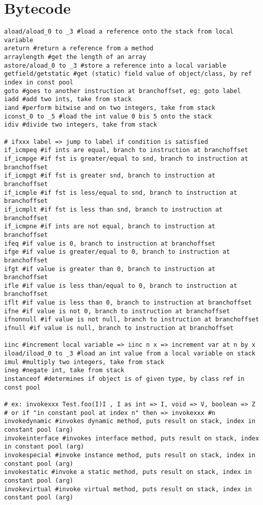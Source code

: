 \documentclass{article}
\begin{document}
\newpage



\section{Bytecode}
\begin{lstlisting}
aload/aload_0 to _3 #load a reference onto the stack from local variable
areturn #return a reference from a method
arraylength #get the length of an array
astore/aload_0 to _3 #store a reference into a local variable
getfield/getstatic #get (static) field value of object/class, by ref index in const pool
goto #goes to another instruction at branchoffset, eg: goto label
iadd #add two ints, take from stack
iand #perform bitwise and on two integers, take from stack
iconst_0 to _5 #load the int value 0 bis 5 onto the stack
idiv #divide two integers, take from stack

# ifxxx label => jump to label if condition is satisfied
if_icmpeq #if ints are equal, branch to instruction at branchoffset
if_icmpge #if fst is greater/equal to snd, branch to instruction at branchoffset
if_icmpgt #if fst is greater snd, branch to instruction at branchoffset
if_icmple #if fst is less/equal to snd, branch to instruction at branchoffset
if_icmplt #if fst is less than snd, branch to instruction at branchoffset
if_icmpne #if ints are not equal, branch to instruction at branchoffset
ifeq #if value is 0, branch to instruction at branchoffset
ifge #if value is greater/equal to 0, branch to instruction at branchoffset
ifgt #if value is greater than 0, branch to instruction at branchoffset
ifle #if value is less than/equal to 0, branch to instruction at branchoffset
iflt #if value is less than 0, branch to instruction at branchoffset
ifne #if value is not 0, branch to instruction at branchoffset
ifnonnull #if value is not null, branch to instruction at branchoffset
ifnull #if value is null, branch to instruction at branchoffset

iinc #increment local variable => iinc n x => increment var at n by x
iload/iload_0 to _3 #load an int value from a local variable on stack
imul #multiply two integers, take from stack
ineg #negate int, take from stack
instanceof #determines if object is of given type, by class ref in const pool

# ex: invokexxx Test.foo(I)I , I as int => I, void => V, boolean => Z
# or if "in constant pool at index n" then => invokexxx #n
invokedynamic #invokes dynamic method, puts result on stack, index in constant pool (arg)
invokeinterface #invokes interface method, puts result on stack, index in constant pool (arg)
invokespecial #invoke instance method, puts result on stack, index in constant pool (arg)
invokestatic #invoke a static method, puts result on stack, index in constant pool (arg)
invokevirtual #invoke virtual method, puts result on stack, index in constant pool (arg)


\end{lstlisting}
\end{document}
